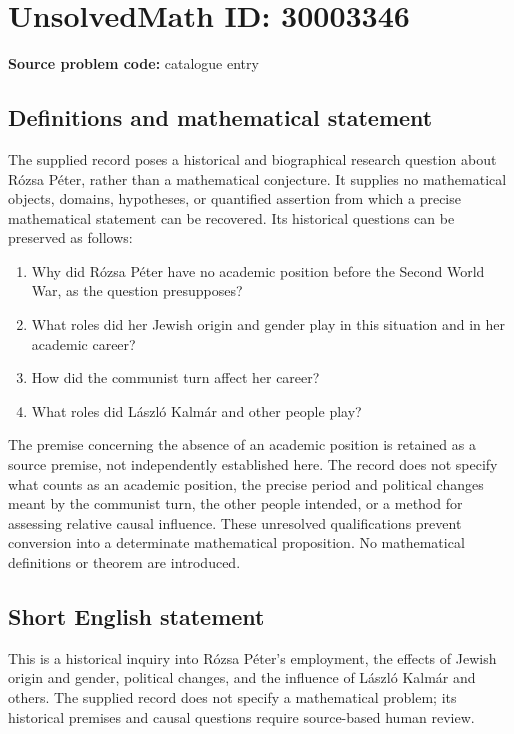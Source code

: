 \documentclass[11pt]{article}
\begin{document}
\section*{UnsolvedMath ID: 30003346}
\textbf{Source problem code:} catalogue entry
\subsection{Definitions and mathematical statement}
The supplied record poses a historical and biographical research question about Rózsa Péter, rather than a mathematical conjecture. It supplies no mathematical objects, domains, hypotheses, or quantified assertion from which a precise mathematical statement can be recovered. Its historical questions can be preserved as follows:
\begin{enumerate}
\item Why did Rózsa Péter have no academic position before the Second World War, as the question presupposes?
\item What roles did her Jewish origin and gender play in this situation and in her academic career?
\item How did the communist turn affect her career?
\item What roles did László Kalmár and other people play?
\end{enumerate}
The premise concerning the absence of an academic position is retained as a source premise, not independently established here. The record does not specify what counts as an academic position, the precise period and political changes meant by the communist turn, the other people intended, or a method for assessing relative causal influence. These unresolved qualifications prevent conversion into a determinate mathematical proposition. No mathematical definitions or theorem are introduced.
\subsection{Short English statement}
This is a historical inquiry into Rózsa Péter's employment, the effects of Jewish origin and gender, political changes, and the influence of László Kalmár and others. The supplied record does not specify a mathematical problem; its historical premises and causal questions require source-based human review.
\end{document}
